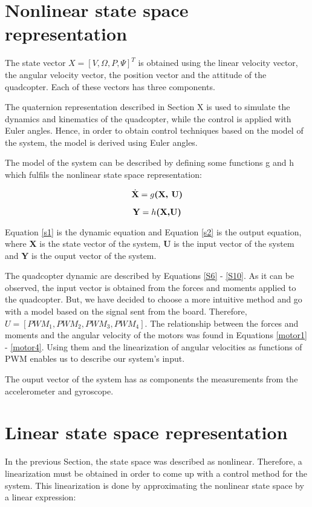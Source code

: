 \section{Nonlinear state space representation}
The state vector $X=[V, \Omega, P, \Psi]^{T}$ is obtained using the linear velocity vector, the angular velocity vector, the position vector and the attitude of the quadcopter. Each of these vectors has three components.

The quaternion representation described in Section X is used to simulate the dynamics and kinematics of the quadcopter, while the control is applied with Euler angles. Hence, in order to obtain control techniques based on the model of the system, the model is derived using Euler angles.

The model of the system can be described by defining some functions g and h which fulfils the nonlinear state space representation:

\begin{equation}
\label{s1} 
 	\dot{\textbf{X}}=g\textbf{(X, U)} \\
 \end{equation}

\begin{equation}
\label{s2} 
 	\textbf{Y}=h\textbf{(X,U)} \\
 \end{equation}
 
Equation \ref{s1} is the dynamic equation and Equation \ref{s2}  is the output equation, where \textbf{X} is the state vector of the system, \textbf{U} is the input vector of the system and \textbf{Y} is the ouput vector of the system.

The quadcopter dynamic are described by Equations \ref{S6} - \ref{S10}. As it can be observed, the input vector is obtained from the forces and moments applied to the quadcopter. But, we have decided to choose a more intuitive method and go with a model based on the signal sent from the board. Therefore, $U=[PWM_{1}, PWM_{2}, PWM_{3}, PWM_{4}]$. The relationship between the forces and moments and the angular velocity of the motors was found in Equations \ref{motor1} - \ref{motor4}. Using them and the linearization of angular velocities as functions of PWM enables us to describe our system's input.

The ouput vector of the system has as components the measurements from the accelerometer and gyroscope.

\section{Linear state space representation}
In the previous Section, the state space was described as nonlinear. Therefore, a linearization must be obtained in order to come up with a control method for the system. This linearization is done by approximating the nonlinear state space by a linear expression:

